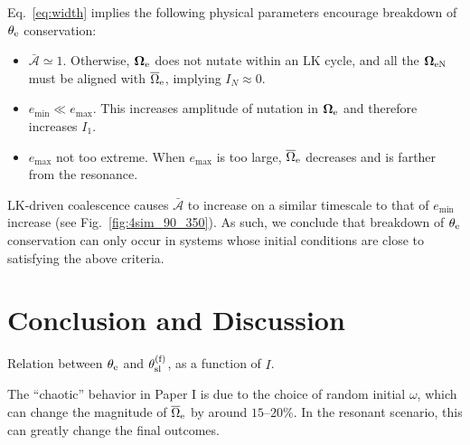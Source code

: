 \documentclass[
        twocolumn,
        twocolappendix
    ]{aastex63}
\renewcommand*{\bm}[1]{\boldsymbol{\mathbf{#1}}}
\begin{document}
Eq.~\eqref{eq:width} implies the following physical parameters encourage
breakdown of $\theta_{\rm e}$ conservation:
\begin{itemize}
    \item $\bar{\mathcal{A}} \simeq 1$. Otherwise, $\bm{\Omega}_{\rm
        e}$ does not nutate within an LK cycle, and all the $\bm{\Omega}_{\rm
        eN}$ must be aligned with $\overline{\Omega}_{\rm e}$, implying $I_N
        \approx 0$.

    \item $e_{\min} \ll e_{\max}$. This increases amplitude of nutation in
        $\bm{\Omega}_{\rm e}$ and therefore increases $I_1$.

    \item $e_{\max}$ not too extreme. When $e_{\max}$ is too large,
        $\overline{\Omega}_{\rm e}$ decreases and is farther from the resonance.
\end{itemize}

LK-driven coalescence causes $\bar{\mathcal{A}}$ to increase on a similar
timescale to that of $e_{\min}$ increase (see Fig.~\ref{fig:4sim_90_350}). As
such, we conclude that breakdown of $\theta_{\rm e}$ conservation can only occur
in systems whose initial conditions are close to satisfying the above criteria.

\section{Conclusion and Discussion}\label{s:discussion}

Relation between $\theta_{\rm e}$ and $\theta_{\rm sl}^{\rm (f)}$, as a function
of $I$.

The ``chaotic'' behavior in Paper I is due to the choice of random initial
$\omega$, which can change the magnitude of $\overline{\Omega}_{\rm e}$ by
around $15$--$20\%$. In the resonant scenario, this can greatly change the final
outcomes.




\appendix


\end{document}
